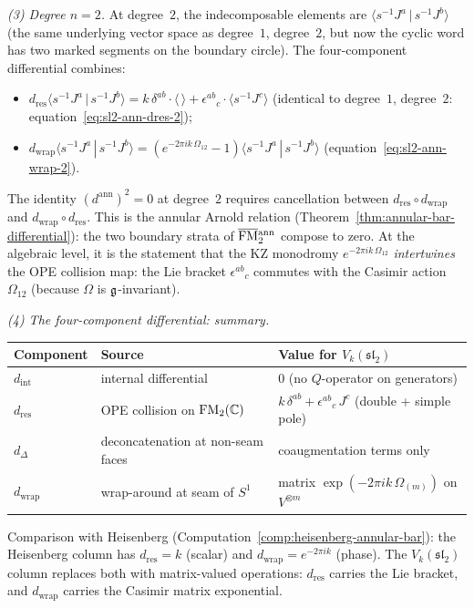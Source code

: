 \begin{computation}
\smallskip
\noindent
\emph{(3) Degree $n=2$.}
At degree~$2$, the indecomposable elements are
$\langle s^{-1}J^a\,|\,s^{-1}J^b\rangle$
(the same underlying vector space as degree~$1$,
degree~$2$, but now the cyclic word has two marked
segments on the boundary circle).
The four-component differential combines:
\begin{itemize}
\item $d_{\mathrm{res}}
 \langle s^{-1}J^a\,|\,s^{-1}J^b\rangle
 = k\,\delta^{ab}\cdot\langle\,\rangle
 + \epsilon^{ab}{}_c\cdot\langle s^{-1}J^c\rangle$
 (identical to degree~$1$, degree~$2$:
 equation~\eqref{eq:sl2-ann-dres-2});
\item $d_{\mathrm{wrap}}
 \langle s^{-1}J^a\,|\,s^{-1}J^b\rangle
 = (e^{-2\pi ik\,\Omega_{12}} - 1)
 \langle s^{-1}J^a\,|\,s^{-1}J^b\rangle$
 (equation~\eqref{eq:sl2-ann-wrap-2}).
\end{itemize}
The identity $(d^{\mathrm{ann}})^2 = 0$ at degree~$2$
requires cancellation between
$d_{\mathrm{res}} \circ d_{\mathrm{wrap}}$ and
$d_{\mathrm{wrap}} \circ d_{\mathrm{res}}$.
This is the annular Arnold relation
(Theorem~\ref{thm:annular-bar-differential}): the
two boundary strata of $\overline{\mathrm{FM}}{}^{\mathrm{ann}}_{2}$
compose to zero. At the algebraic level, it is the
statement that the KZ monodromy
$e^{-2\pi ik\,\Omega_{12}}$ \emph{intertwines} the
OPE collision map: the Lie bracket $\epsilon^{ab}{}_c$
commutes with the Casimir action $\Omega_{12}$
(because $\Omega$ is $\mathfrak{g}$-invariant).

\smallskip
\noindent
\emph{(4) The four-component differential: summary.}
\begin{center}
\small
\renewcommand{\arraystretch}{1.3}
\begin{tabular}{@{}l@{\;\;}l@{\;\;}l@{}}
\textbf{Component} & \textbf{Source} &
 \textbf{Value for $V_k(\mathfrak{sl}_2)$} \\
\hline
$d_{\mathrm{int}}$
 & internal differential
 & $0$ (no $Q$-operator on generators) \\[2pt]
$d_{\mathrm{res}}$
 & OPE collision on $\mathrm{FM}_2(\mathbb{C})$
 & $k\,\delta^{ab} + \epsilon^{ab}{}_c\, J^c$
 \;(double + simple pole) \\[2pt]
$d_\Delta$
 & deconcatenation at non-seam faces
 & coaugmentation terms only \\[2pt]
$d_{\mathrm{wrap}}$
 & wrap-around at seam of $S^1$
 & matrix $\exp(-2\pi ik\,\Omega_{(m)})$
 on $V^{\otimes m}$
\end{tabular}
\end{center}
Comparison with Heisenberg
(Computation~\ref{comp:heisenberg-annular-bar}):
the Heisenberg column has $d_{\mathrm{res}} = k$
(scalar) and $d_{\mathrm{wrap}} = e^{-2\pi ik}$ (phase).
The $V_k(\mathfrak{sl}_2)$ column replaces both with
matrix-valued operations: $d_{\mathrm{res}}$ carries
the Lie bracket, and $d_{\mathrm{wrap}}$ carries the
Casimir matrix exponential.


\end{computation}
